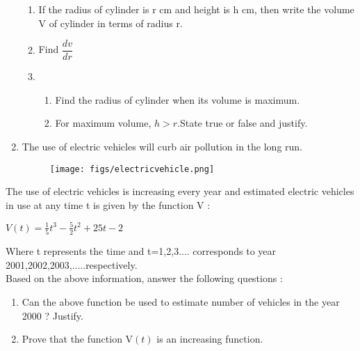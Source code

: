 \documentclass{article}
\providecommand{\brak}[1]{\ensuremath{\left(#1\right)}}
\begin{document}
\begin{enumerate}
 \begin{enumerate}[label=(\roman*)]

     \item  If the radius of cylinder is r cm and height is h cm, then write the volume V of cylinder in terms of radius r. 
     \item Find $\dfrac{dv}{dr}$ 
     
     \item 
	     \begin{enumerate}[label=(\alph*)]
     \item Find the radius of cylinder when its volume is maximum. 
   
     \item  For maximum volume, $h > r$.State true or false and justify. 
 \end{enumerate}
 \end{enumerate}
    
 \item The use of electric vehicles will curb air pollution in the long run.
 
\begin{figure}[!h]
	\begin{center}
\texttt{[image: figs/electricvehicle.png]}
	\end{center}
\caption{}
\label{fig:electricvehicle}
\end{figure}
\end{enumerate}
  
 The use of electric vehicles is increasing every year and estimated electric vehicles in use at any time t is given by the function V :
 
 
    $V\brak{t}=\frac{1}{5}t^3 - \frac{5}{2}t^2 + 25t-2$ 



 Where t represents the time and t=1,2,3.... corresponds to year 2001,2002,2003,.....respectively.\\
 Based on the above information, answer the following questions :
 \begin{enumerate}[label=(\roman*)]
     \item Can the above function be used to estimate number of vehicles in the year 2000 ? Justify. 
     \item Prove that the function V\brak{t} is an increasing function.
 \end{enumerate}
 
 
   
  
  
\end{document}
